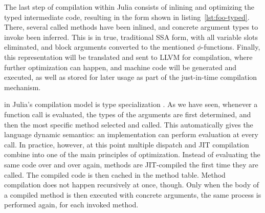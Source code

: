 The last step of compilation within Julia consists of inlining and optimizing the typed intermediate
code, resulting in the form shown in listing~\ref{lst:foo-typed}.  There, several called methods
have been inlined, and concrete argument types to invoke been inferred.  This is in true,
traditional SSA form, with all variable slots eliminated, and block arguments converted to the
mentioned \(\phi\)-functions.  Finally, this representation will be translated and sent to LLVM for
compilation, where further optimization can happen, and machine code will be generated and executed,
as well as stored for later usage as part of the just-in-time compilation mechanism.

 in Julia's compilation model is type specialization
\parencite{bezanson2018julia}.  As we have seen, whenever a function call is evaluated, the types of
the arguments are first determined, and then the most specific method selected and called.  This
automatically gives the language dynamic semantics: an implementation can perform evaluation at
every call.  In practice, however, at this point multiple dispatch and JIT compilation combine into
one of the main principles of optimization.  Instead of evaluating the same code over and over
again, methods are JIT-compiled the first time they are called.  The compiled code is then cached in
the method table.  Method compilation does not happen recursively at once, though.  Only when the
body of a compiled method is then executed with concrete arguments, the same process is performed
again, for each invoked method.

